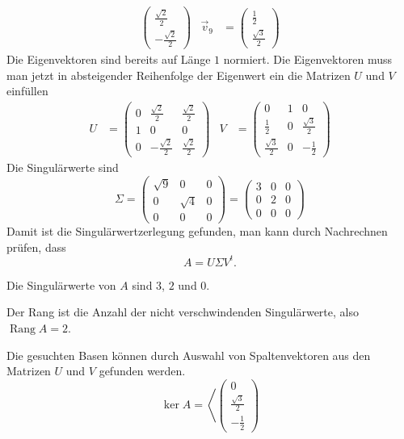 \begin{loesung}
\begin{align*}
\begin{pmatrix}
\frac{\sqrt{2}}2\\
-\frac{\sqrt{2}}2
\end{pmatrix}
&
\vec{v}_9
&=
\begin{pmatrix}
\frac12\\
\frac{\sqrt{3}}2
\end{pmatrix}
\end{align*}
Die Eigenvektoren sind bereits auf Länge $1$ normiert.
Die Eigenvektoren muss man jetzt in absteigender Reihenfolge der Eigenwert
ein die Matrizen $U$ und $V$ einfüllen
\begin{align*}
U
&=
\begin{pmatrix}
0&\frac{\sqrt{2}}2 & \frac{\sqrt{2}}2 \\
1&        0        &        0         \\
0&-\frac{\sqrt{2}}2 & \frac{\sqrt{2}}2
\end{pmatrix}
&
V
&=
\begin{pmatrix}
   0             & 1 & 0 \\
\frac12          & 0 & \frac{\sqrt{3}}2 \\
\frac{\sqrt{3}}2 & 0 & -\frac{1}{2}
\end{pmatrix}
\end{align*}
Die Singulärwerte sind
\[
\Sigma
=
\begin{pmatrix}
\sqrt{9} &     0    & 0 \\
    0    & \sqrt{4} & 0 \\
    0    &     0    & 0
\end{pmatrix}
=
\begin{pmatrix}
    3    &     0    & 0 \\
    0    &     2    & 0 \\
    0    &     0    & 0
\end{pmatrix}
\]
Damit ist die Singulärwertzerlegung gefunden, man kann durch Nachrechnen
prüfen, dass
\[
A = U\Sigma V^t.
\]
\begin{teilaufgaben}
\item
Die Singulärwerte von $A$ sind $3$, $2$ und $0$.
\item
Der Rang ist die Anzahl der nicht verschwindenden Singulärwerte, also
$\operatorname{Rang}A=2$.
\item
Die gesuchten Basen können durch Auswahl von Spaltenvektoren aus den 
Matrizen $U$ und $V$ gefunden werden.
\[
\operatorname{ker} A
=
\left\langle
\begin{pmatrix}
0\\ \frac{\sqrt{3}}2 \\ -\frac12

\end{pmatrix}\]
\end{teilaufgaben}
\end{loesung}
